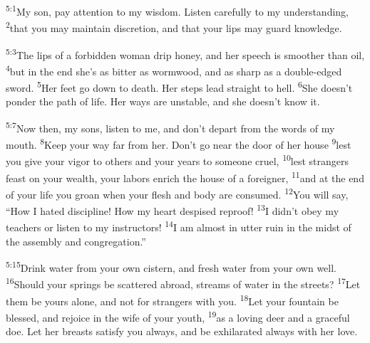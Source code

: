\documentclass[openany,12pt,english]{book}
\newenvironment{para}{\par\pretolerance=100\tolerance=200\setlength{\emergencystretch}{0.6em}\relax}{\par}
\begin{document}
\bigskip{}

\begin{para}
    \textsuperscript{5:1}\thinspace{}My son, pay at\-ten\-tion to my wis\-dom. Lis\-ten care\-ful\-ly to my un\-der\-stand\-ing,
    \textsuperscript{2}\thinspace{}that you may main\-tain dis\-cre\-tion, and that your lips may guard knowl\-edge.
\end{para}

\begin{para}
    \textsuperscript{5:3}\thinspace{}The lips of a for\-bid\-den wom\-an drip hon\-ey, and her speech is smooth\-er than oil,
    \textsuperscript{4}\thinspace{}but in the end she's as bit\-ter as worm\-wood, and as sharp as a double-edged sword.
    \textsuperscript{5}\thinspace{}Her feet go down to death. Her steps lead straight to hell.
    \textsuperscript{6}\thinspace{}She does\-n't pon\-der the path of life. Her ways are un\-sta\-ble, and she does\-n't know it.
\end{para}

\begin{para}
    \textsuperscript{5:7}\thinspace{}Now then, my sons, lis\-ten to me, and don't de\-part from the words of my mouth.
    \textsuperscript{8}\thinspace{}Keep your way far from her. Don't go near the door of her house
    \textsuperscript{9}\thinspace{}lest you give your vig\-or to others and your years to some\-one cru\-el,
    \textsuperscript{10}\thinspace{}lest strangers feast on your wealth, your labors en\-rich the house of a for\-eign\-er,
    \textsuperscript{11}\thinspace{}and at the end of your life you groan when your flesh and bod\-y are con\-sumed.
    \textsuperscript{12}\thinspace{}You will say, “How I hat\-ed dis\-ci\-pline! How my heart de\-spised re\-proof!
    \textsuperscript{13}\thinspace{}I did\-n't o\-bey my teachers or lis\-ten to my instructors!
    \textsuperscript{14}\thinspace{}I am al\-most in ut\-ter ru\-in in the midst of the as\-sem\-bly and con\-gre\-ga\-tion.”
\end{para}

\begin{para}
    \textsuperscript{5:15}\thinspace{}Drink wa\-ter from your own cis\-tern, and fresh wa\-ter from your own well.
    \textsuperscript{16}\thinspace{}Should your springs be scattered a\-broad, streams of wa\-ter in the streets?
    \textsuperscript{17}\thinspace{}Let them be yours a\-lone, and not for strangers with you.
    \textsuperscript{18}\thinspace{}Let your foun\-tain be bless\-ed, and re\-joice in the wife of your youth,
    \textsuperscript{19}\thinspace{}as a lov\-ing deer and a grace\-ful doe. Let her breasts sat\-is\-fy you al\-ways, and be ex\-hil\-a\-rat\-ed al\-ways with her love.
\end{para}
\end{document}

